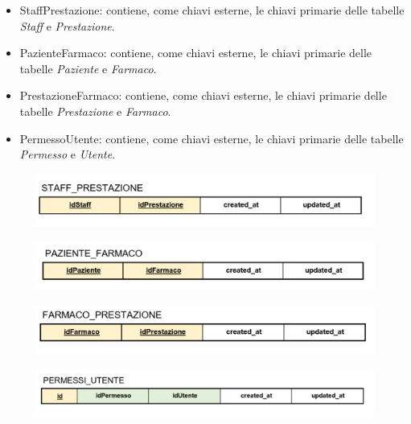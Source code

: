 \documentclass[paper=a4, fontsize=11pt,x11names]{report}
\begin{document}
\begin{itemize}
\item StaffPrestazione: contiene, come chiavi esterne, le chiavi primarie delle tabelle \textit{Staff} e \textit{Prestazione}.
\item PazienteFarmaco: contiene, come chiavi esterne, le chiavi primarie delle tabelle \textit{Paziente} e \textit{Farmaco}.
\item PrestazioneFarmaco: contiene, come chiavi esterne, le chiavi primarie delle tabelle \textit{Prestazione} e \textit{Farmaco}.
\item PermessoUtente: contiene, come chiavi esterne, le chiavi primarie delle tabelle \textit{Permesso} e \textit{Utente}.
\end{itemize}

\begin{figure}[H]
\begin{center}
\includegraphics[scale=0.4]{staffPrestazioneSchema}
\end{center}
\end{figure}

\begin{figure}[H]
\begin{center}
\includegraphics[scale=0.4]{pazienteFarmacoSchema}
\end{center}
\end{figure}

\begin{figure}[H]
\begin{center}
\includegraphics[scale=0.4]{farmacoPrestazioneSchema}
\end{center}
\end{figure}

\begin{figure}[H]
\begin{center}
\includegraphics[scale=0.4]{permessiUtenteSchema}
\end{center}
\end{figure}
\end{document}
